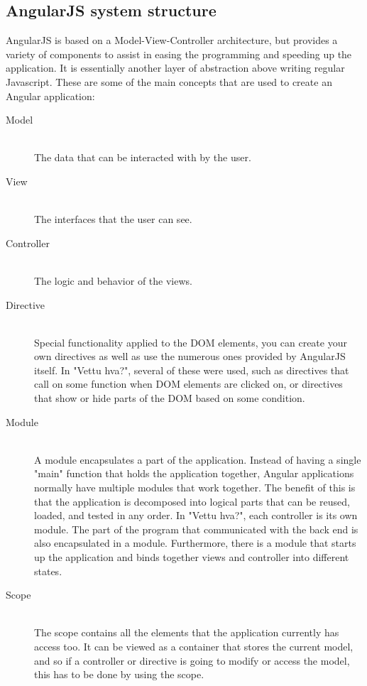 \subsection{AngularJS system structure}

AngularJS is based on a Model-View-Controller architecture, but provides a variety of components to assist in easing the programming and speeding up the application. It is essentially another layer of abstraction above writing regular Javascript. These are some of the main concepts that are used to create an Angular application:

\begin{description}
	\item[Model] \hfill \\ 
	The data that can be interacted with by the user.
	
	\item[View] \hfill \\ 
	The interfaces that the user can see.
	
	\item[Controller] \hfill \\ 
	The logic and behavior of the views.
	
	\item[Directive] \hfill \\ 
	Special functionality applied to the DOM elements, you can create your own directives as well as use the numerous ones provided by AngularJS itself. In "Vettu hva?", several of these were used, such as directives that call on some function when DOM elements are clicked on, or directives that show or hide parts of the DOM based on some condition.
	
	\item[Module] \hfill \\ 
	A module encapsulates a part of the application. Instead of having a single "main" function that holds the application together, Angular applications normally have multiple modules that work together. The benefit of this is that the application is decomposed into logical parts that can be reused, loaded, and tested in any order. In "Vettu hva?", each controller is its own module. The part of the program that communicated with the back end is also encapsulated in a module. Furthermore, there is a module that starts up the application and binds together views and controller into different states.
	
	\item[Scope] \hfill \\ 
	The scope contains all the elements that the application currently has access too. It can be viewed as a container that stores the current model, and so if a controller or directive is going to modify or access the model, this has to be done by using the scope.
	

\end{description}
